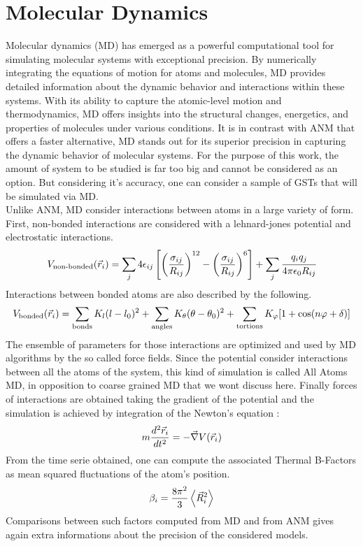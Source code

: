 \section{Molecular Dynamics}
Molecular dynamics (MD) has emerged as a powerful computational tool for simulating molecular systems with exceptional precision. By numerically integrating the equations of motion for atoms and molecules, MD provides detailed information about the dynamic behavior and interactions within these systems. With its ability to capture the atomic-level motion and thermodynamics, MD offers insights into the structural changes, energetics, and properties of molecules under various conditions. It is in contrast with ANM that offers a faster alternative, MD stands out for its superior precision in capturing the dynamic behavior of molecular systems. For the purpose of this work, the amount of system to be studied is far too big and cannot be considered as an option. But considering it's accuracy, one can consider a sample of GSTs that will be simulated via MD.\\
Unlike ANM, MD consider interactions between atoms in a large variety of form. First, non-bonded interactions are considered with a lehnard-jones potential and electrostatic interactions.
\begin{equation}
	\label{non-bonded}
	V_{\text{non-bonded}}(\vec{r}_i) = \sum_j 4\epsilon_{ij}\left[ \left( \frac{\sigma_{ij}}{R_{ij}} \right)^{12} - \left( \frac{\sigma_{ij}}{R_{ij}} \right)^{6} \right] + \sum_j\cfrac{q_iq_j}{4\pi\epsilon_0R_{ij}}
\end{equation}
Interactions between bonded atoms are also described by the following.
\begin{equation}
	\label{bonded}
	V_{\text{bonded}}(\vec{r}_i) = \sum_{\text{bonds}} K_l(l - l_0)^2 + \sum_{\text{angles}} K_\theta(\theta - \theta_0)^2 + \sum_{\text{tortions}} K_\varphi [1 + \cos (n\varphi + \delta)]
\end{equation}
The ensemble of parameters for those interactions are optimized and used by MD algorithms by the so called force fields. Since the potential consider interactions between all the atoms of the system, this kind of simulation is called All Atoms MD, in opposition to coarse grained MD that we wont discuss here. Finally forces of interactions are obtained taking the gradient of the potential and the simulation is achieved by integration of the Newton's equation :
\begin{equation}
	\label{Newton}
	m\frac{d^2\vec{r}_i}{dt^2} = -\vec{\nabla}V(\vec{r}_i)
\end{equation}
From the time serie obtained, one can compute the associated Thermal B-Factors as mean squared fluctuations of the atom's position.
\begin{equation}
	\label{MD thermal B-factors}
	\beta_i = \frac{8\pi^2}{3}\left< \vec{R}_i^2 \right>
\end{equation}
Comparisons between such factors computed from MD and from ANM gives again extra informations about the precision of the considered models.